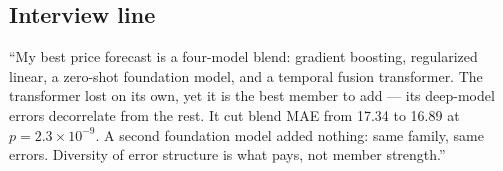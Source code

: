 \subsection{Interview line}

``My best price forecast is a four-model blend: gradient boosting,
regularized linear, a zero-shot foundation model, and a temporal
fusion transformer. The transformer lost on its own, yet it is the
best member to add --- its deep-model errors decorrelate from the
rest. It cut blend MAE from 17.34 to 16.89 at $p = 2.3\times10^{-9}$.
A second foundation model added nothing: same family, same errors.
Diversity of error structure is what pays, not member strength.''
